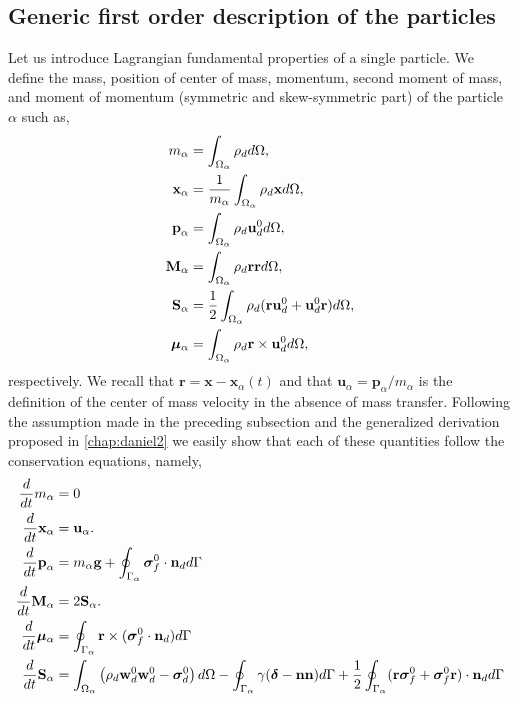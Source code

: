 
\subsection{Generic first order description of the particles}

Let us introduce Lagrangian fundamental properties of a single particle. 
We define the mass, position of center of mass, momentum, second moment of mass, and moment of momentum (symmetric and skew-symmetric part)  of the particle $\alpha$ such as, 
\begin{align}
    m_\alpha
    &= \int_{\Omega_{\alpha}}  \rho_d   d\Omega,\\
    \textbf{x}_\alpha
    &= \frac{1}{m_\alpha }\int_{\Omega_{\alpha}}  \rho_d \textbf{x}  d\Omega,\\
    \textbf{p}_\alpha 
    &= \int_{\Omega_{\alpha}}  \rho_d \textbf{u}_d^0  d\Omega,\\
    \textbf{M}_\alpha 
    &= \int_{\Omega_{\alpha}}  \rho_d \textbf{rr}  d\Omega, \\
    \textbf{S}_\alpha 
    &= \frac{1}{2}\int_{\Omega_{\alpha}}  \rho_d (\textbf{r}\textbf{u}_d^0+\textbf{u}_d^0\textbf{r})  d\Omega,\\
    \bm\mu_\alpha 
    &= \int_{\Omega_{\alpha}}  \rho_d \textbf{r}\times\textbf{u}_d^0  d\Omega,
    \label{eq:position_and_momentum_def}
\end{align}
respectively. 
We recall that $\textbf{r} = \textbf{x} - \textbf{x}_\alpha(t)$ and that $\textbf{u}_\alpha = \textbf{p}_\alpha /m_\alpha$ is the definition of the center of mass velocity in the absence of mass transfer. 
Following the assumption made in the preceding subsection and the generalized derivation proposed in \ref{chap:daniel2} we easily show that each of these quantities follow the conservation equations, namely,
\begin{align}
    \label{eq:dt_m_alpha}
    \frac{d}{dt} m_\alpha
    &= 
    0\\
    \frac{d}{dt} {\textbf{x}_\alpha}
    &=\textbf{u}_\alpha. 
    \label{eq:dt_x_alpha}\\
    \label{eq:dt_p_alpha}
    \frac{d}{dt} \textbf{p}_\alpha
    &= 
    m_\alpha\textbf{g}
    +  \oint_{\Gamma_{\alpha}} \bm{\sigma}_f^0 \cdot \textbf{n}_d d\Gamma\\
    \frac{d}{dt} {\textbf{M}_\alpha}
    &=2\textbf{S}_\alpha. 
    \label{eq:dt_M_alpha}
    \\
    \frac{d}{dt} {\bm\mu_\alpha}
    &=
     \oint_{\Gamma_{\alpha}}  \textbf{r}\times(\bm{\sigma}_f^0\cdot \textbf{n}_d) d\Gamma 
    \label{eq:dt_mu_alpha}\\
    \frac{d}{dt} {\textbf{S}_\alpha}
    &= \int_{\Omega_{\alpha}}  \left(
        \rho_d  \textbf{w}_d^0 \textbf{w}_d^0 
        - \bm{\sigma}_d^0
    \right)  d\Omega
    - \oint_{\Gamma_{\alpha}}  
        \gamma (\bm\delta - \textbf{nn})
     d\Gamma
    + \frac{1}{2}\oint_{\Gamma_{\alpha}}  (\textbf{r}\bm{\sigma}_f^0+\bm{\sigma}_f^0\textbf{r})\cdot \textbf{n}_d d\Gamma 
    \label{eq:dt_S_alpha}
\end{align}
